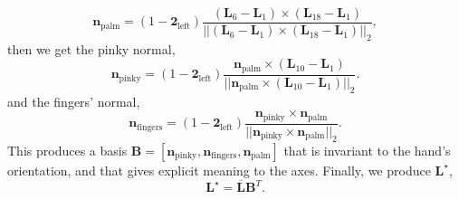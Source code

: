 \documentclass[a4paper, 11pt, twocolumn]{IEEEtran}
\begin{document}
    \begin{equation}
        \mathbf{n}_{\mathrm{palm}} = (1 - \mathbf{2}_{\textrm{left}})\frac{(\mathbf{L}_6 - \mathbf{L}_1)\times(\mathbf{L}_{18} - \mathbf{L}_1)}{||(\mathbf{L}_6 - \mathbf{L}_1)\times(\mathbf{L}_{18} - \mathbf{L}_1)||_2},
    \end{equation}
    then we get the pinky normal,
    \begin{equation}
        \mathbf{n}_{\mathrm{pinky}} = (1 - \mathbf{2}_{\textrm{left}})\frac{\mathbf{n}_{\mathrm{palm}}\times(\mathbf{L}_{10} - \mathbf{L}_1)}{||\mathbf{n}_{\mathrm{palm}}\times(\mathbf{L}_{10} - \mathbf{L}_1)||_2}.
    \end{equation}
    and the fingers' normal,
    \begin{equation}
        \mathbf{n}_{\mathrm{fingers}} = (1 - \mathbf{2}_{\textrm{left}})\frac{\mathbf{n}_{\mathrm{pinky}}\times \mathbf{n}_{\mathrm{palm}}}{||\mathbf{n}_{\mathrm{pinky}}\times \mathbf{n}_{\mathrm{palm}}||_2}.
    \end{equation}
    This produces a basis $\mathbf{B} = \left[\mathbf{n}_{\mathrm{pinky}}, \mathbf{n}_{\mathrm{fingers}}, \mathbf{n}_{\mathrm{palm}}\right]$ that is invariant to the hand's orientation, and that gives explicit meaning to the axes. Finally, we produce $\mathbf{L}^\star$,
    \begin{equation}
        \mathbf{L}^\star = \overline{\mathbf{L}}\mathbf{B}^T.
    \end{equation}
\end{document}
